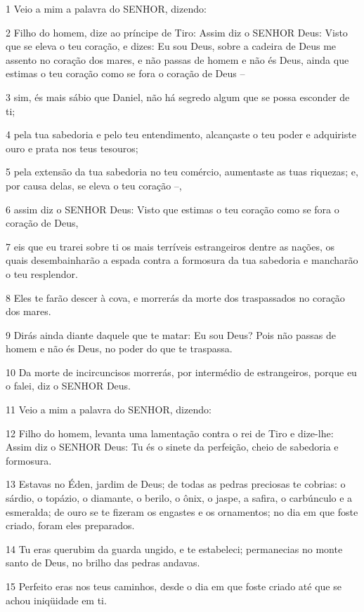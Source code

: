 \par 1 Veio a mim a palavra do SENHOR, dizendo:
\par 2 Filho do homem, dize ao príncipe de Tiro: Assim diz o SENHOR Deus: Visto que se eleva o teu coração, e dizes: Eu sou Deus, sobre a cadeira de Deus me assento no coração dos mares, e não passas de homem e não és Deus, ainda que estimas o teu coração como se fora o coração de Deus --
\par 3 sim, és mais sábio que Daniel, não há segredo algum que se possa esconder de ti;
\par 4 pela tua sabedoria e pelo teu entendimento, alcançaste o teu poder e adquiriste ouro e prata nos teus tesouros;
\par 5 pela extensão da tua sabedoria no teu comércio, aumentaste as tuas riquezas; e, por causa delas, se eleva o teu coração --,
\par 6 assim diz o SENHOR Deus: Visto que estimas o teu coração como se fora o coração de Deus,
\par 7 eis que eu trarei sobre ti os mais terríveis estrangeiros dentre as nações, os quais desembainharão a espada contra a formosura da tua sabedoria e mancharão o teu resplendor.
\par 8 Eles te farão descer à cova, e morrerás da morte dos traspassados no coração dos mares.
\par 9 Dirás ainda diante daquele que te matar: Eu sou Deus? Pois não passas de homem e não és Deus, no poder do que te traspassa.
\par 10 Da morte de incircuncisos morrerás, por intermédio de estrangeiros, porque eu o falei, diz o SENHOR Deus.
\par 11 Veio a mim a palavra do SENHOR, dizendo:
\par 12 Filho do homem, levanta uma lamentação contra o rei de Tiro e dize-lhe: Assim diz o SENHOR Deus: Tu és o sinete da perfeição, cheio de sabedoria e formosura.
\par 13 Estavas no Éden, jardim de Deus; de todas as pedras preciosas te cobrias: o sárdio, o topázio, o diamante, o berilo, o ônix, o jaspe, a safira, o carbúnculo e a esmeralda; de ouro se te fizeram os engastes e os ornamentos; no dia em que foste criado, foram eles preparados.
\par 14 Tu eras querubim da guarda ungido, e te estabeleci; permanecias no monte santo de Deus, no brilho das pedras andavas.
\par 15 Perfeito eras nos teus caminhos, desde o dia em que foste criado até que se achou iniqüidade em ti.
